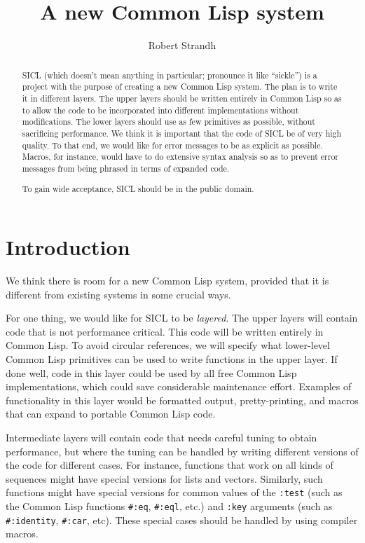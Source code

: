 \documentclass{article}
\title{{\Huge \sysname{}}\\
A new Common Lisp system}
\author{Robert Strandh}
\def\sysname{SICL}
\begin{document}
\maketitle

\begin{abstract}
\sysname{} (which doesn't mean anything in particular; pronounce it
like ``sickle'') is a project with the purpose of creating a new
Common Lisp system.  The plan is to write it in different layers.  The
upper layers should be written entirely in Common Lisp so as to allow
the code to be incorporated into different implementations without
modifications.  The lower layers should use as few primitives as
possible, without sacrificing performance.  We think it is important
that the code of \sysname{} be of very high quality.  To that end, we
would like for error messages to be as explicit as possible.  Macros,
for instance, would have to do extensive syntax analysis so as to
prevent error messages from being phrased in terms of expanded code.

To gain wide acceptance, \sysname{} should be in the public domain.
\end{abstract}

\section{Introduction}

We think there is room for a new Common Lisp system, provided that it
is different from existing systems in some crucial ways.

For one thing, we would like for \sysname{} to be \emph{layered}.  The
upper layers will contain code that is not performance critical.  This
code will be written entirely in Common Lisp.  To avoid circular
references, we will specify what lower-level Common Lisp primitives
can be used to write functions in the upper layer.  If done well, code
in this layer could be used by all free Common Lisp implementations,
which could save considerable maintenance effort.  Examples of
functionality in this layer would be formatted output,
pretty-printing, and macros that can expand to portable Common Lisp
code. 

Intermediate layers will contain code that needs careful tuning to
obtain performance, but where the tuning can be handled by writing
different versions of the code for different cases.  For instance,
functions that work on all kinds of sequences might have special
versions for lists and vectors.  Similarly, such functions might have
special versions for common values of the \texttt{:test} (such as
the Common Lisp functions \texttt{\#:eq}, \texttt{\#:eql}, etc.)
and \texttt{:key} arguments (such as \texttt{\#:identity},
\texttt{\#:car}, etc).  These special cases should be handled by using
compiler macros. 
\end{document}
